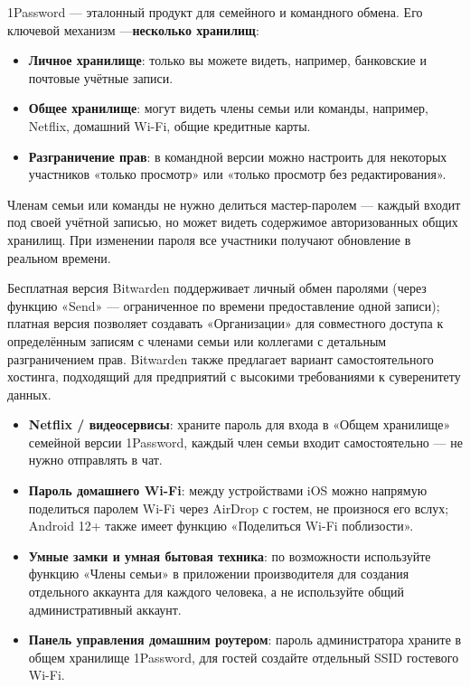 
1Password — эталонный продукт для семейного и командного обмена. Его ключевой механизм —\textbf{несколько хранилищ}:

\begin{itemize}
  \item \textbf{Личное хранилище}: только вы можете видеть, например, банковские и почтовые учётные записи.
  \item \textbf{Общее хранилище}: могут видеть члены семьи или команды, например, Netflix, домашний Wi-Fi, общие кредитные карты.
  \item \textbf{Разграничение прав}: в командной версии можно настроить для некоторых участников «только просмотр» или «только просмотр без редактирования».
\end{itemize}

Членам семьи или команды не нужно делиться мастер-паролем — каждый входит под своей учётной записью, но может видеть содержимое авторизованных общих хранилищ. При изменении пароля все участники получают обновление в реальном времени.


Бесплатная версия Bitwarden поддерживает личный обмен паролями (через функцию «Send» — ограниченное по времени предоставление одной записи); платная версия позволяет создавать «Организации» для совместного доступа к определённым записям с членами семьи или коллегами с детальным разграничением прав. Bitwarden также предлагает вариант самостоятельного хостинга, подходящий для предприятий с высокими требованиями к суверенитету данных.


\begin{itemize}
  \item \textbf{Netflix / видеосервисы}: храните пароль для входа в «Общем хранилище» семейной версии 1Password, каждый член семьи входит самостоятельно — не нужно отправлять в чат.
  \item \textbf{Пароль домашнего Wi-Fi}: между устройствами iOS можно напрямую поделиться паролем Wi-Fi через AirDrop с гостем, не произнося его вслух; Android 12+ также имеет функцию «Поделиться Wi-Fi поблизости».
  \item \textbf{Умные замки и умная бытовая техника}: по возможности используйте функцию «Члены семьи» в приложении производителя для создания отдельного аккаунта для каждого человека, а не используйте общий административный аккаунт.
  \item \textbf{Панель управления домашним роутером}: пароль администратора храните в общем хранилище 1Password, для гостей создайте отдельный SSID гостевого Wi-Fi.
\end{itemize}

